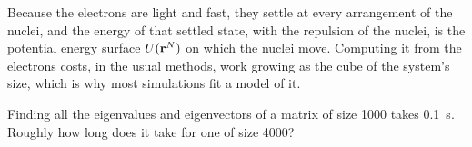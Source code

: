 \begin{keyidea}
Because the electrons are light and fast, they settle at every
arrangement of the nuclei, and the energy of that settled state, with the
repulsion of the nuclei, is the potential energy surface $U(\bm{\mathrm{r}}^N)$ on
which the nuclei move. Computing it from the electrons costs, in the usual
methods, work growing as the cube of the system's size, which is why most simulations fit a
model of it.
\end{keyidea}

\begin{selfcheck}
Finding all the eigenvalues and eigenvectors of a matrix of size 1000
takes \SI{0.1}{\second}. Roughly how long does it take for one of size
4000?
\end{selfcheck}
